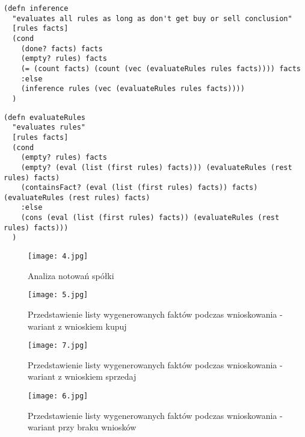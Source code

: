 \begin{lstlisting}
(defn inference
  "evaluates all rules as long as don't get buy or sell conclusion"
  [rules facts]
  (cond
    (done? facts) facts
    (empty? rules) facts
    (= (count facts) (count (vec (evaluateRules rules facts)))) facts
    :else
    (inference rules (vec (evaluateRules rules facts))))
  )
\end{lstlisting}

\begin{lstlisting}
(defn evaluateRules
  "evaluates rules"
  [rules facts]
  (cond
    (empty? rules) facts
    (empty? (eval (list (first rules) facts))) (evaluateRules (rest rules) facts)
    (containsFact? (eval (list (first rules) facts)) facts) (evaluateRules (rest rules) facts)
    :else
    (cons (eval (list (first rules) facts)) (evaluateRules (rest rules) facts)))
  )
\end{lstlisting}

\begin{figure}[H]
	\centering
	\texttt{[image: 4.jpg]}
	\caption{Analiza notowań spółki}
	\label{fig:4}
\end{figure}

\begin{figure}[H]
	\centering
	\texttt{[image: 5.jpg]}
	\caption{Przedstawienie listy wygenerowanych faktów podczas wnioskowania - wariant z wnioskiem kupuj}
	\label{fig:5}
\end{figure}

\begin{figure}[H]
	\centering
	\texttt{[image: 7.jpg]}
	\caption{Przedstawienie listy wygenerowanych faktów podczas wnioskowania - wariant z wnioskiem sprzedaj}
	\label{fig:2}
\end{figure}

\begin{figure}[H]
	\centering
	\texttt{[image: 6.jpg]}
	\caption{Przedstawienie listy wygenerowanych faktów podczas wnioskowania - wariant przy braku wniosków}
	\label{fig:6}
\end{figure}

